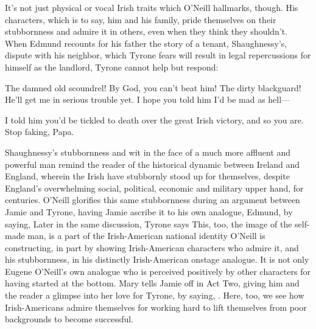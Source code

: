 \documentclass[letterpaper, 12pt]{article}
\newcommand{\oneill}{O'Neill}
\begin{document}
It's not just physical or vocal Irish traits which \oneill{} hallmarks,
though. His characters, which is to say, him and his family, pride themselves
on their stubbornness and admire it in others, even when they think they
shouldn't. When Edmund recounts for his father the story of a tenant,
Shaughnessy's, dispute with his neighbor, which Tyrone fears will result in
legal repercussions for himself as the landlord, Tyrone cannot help but
respond:

\begin{dialogue}
    The damned old
  scoundrel! By God, you can't beat him!  The dirty blackguard! He'll get me in serious trouble
  yet. I hope you told him I'd be mad as hell---

   I told him you'd be tickled to death over the great Irish
  victory, and so you are. Stop faking, Papa.

\end{dialogue}

Shaughnessy's stubbornness and wit in the face of a much more affluent and
powerful man remind the reader of the historical dynamic between Ireland and
England, wherein the Irish have stubbornly stood up for themselves, despite
England's overwhelming social, political, economic and military upper hand, for
centuries. \oneill{} glorifies this same stubbornness during an argument
between Jamie and Tyrone, having Jamie ascribe it to his own analogue, Edmund,
by saying,  Later in the same discussion, Tyrone says  This, too, the image of the self-made man, is a part of the
Irish-American national identity \oneill{} is constructing, in part by showing
Irish-American characters who admire it, and his stubbornness, in his
distinctly Irish-American onstage analogue. It is not only Eugene \oneill{}'s
own analogue who is perceived positively by other characters for having started
at the bottom. Mary tells Jamie off in Act Two, giving him and the reader a
glimpse into her love for Tyrone, by saying,
. Here, too, we
see how Irish-Americans admire themselves for working hard to lift themselves
from poor backgrounds to become successful.

\printbibliography{}
\end{document}
